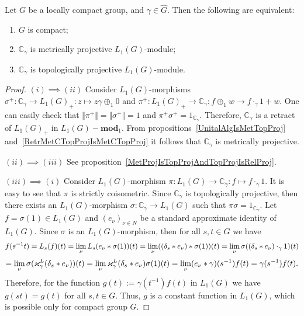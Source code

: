 \begin{proposition}\label{OneDimL1ModMetTopProjCharac} Let $G$ be a locally 
compact group, and $\gamma\in\widehat{G}$. Then the following are equivalent:

\begin{enumerate}[label = (\roman*)]
    \item $G$ is compact;

    \item $\mathbb{C}_\gamma$ is metrically projective $L_1(G)$-module;

    \item $\mathbb{C}_\gamma$ is topologically projective $L_1(G)$-module.
\end{enumerate}
\end{proposition}
\begin{proof} $(i)\implies (ii)$ Consider $L_1(G)$-morphisms 
$\sigma^+:\mathbb{C}_\gamma\to {L_1(G)}_+:z\mapsto z\gamma \oplus_1 0$ 
and $\pi^+:{L_1(G)}_+\to\mathbb{C}_\gamma: f\oplus_1 w\to f\cdot_{\gamma}1+w$. 
One can easily check 
that $\Vert\pi^+\Vert=\Vert\sigma^+\Vert=1$ 
and $\pi^+\sigma^+=1_{\mathbb{C}_\gamma}$. Therefore, $\mathbb{C}_\gamma$ is a 
retract of ${L_1(G)}_+$ in $L_1(G)-\mathbf{mod}_1$. From 
propositions~\ref{UnitalAlgIsMetTopProj} 
and~\ref{RetrMetCTopProjIsMetCTopProj} it follows 
that $\mathbb{C}_\gamma$ is metrically projective.

$(ii)\implies (iii)$ See
proposition~\ref{MetProjIsTopProjAndTopProjIsRelProj}.

$(iii)\implies (i)$ Consider $L_1(G)$-morphism
$\pi:L_1(G)\to\mathbb{C}_\gamma:f\mapsto f\cdot_{\gamma} 1$. It is easy to see
that $\pi$ is strictly coisometric. Since $\mathbb{C}_\gamma$ is topologically
projective, then there exists an $L_1(G)$-morphism $\sigma:\mathbb{C}_\gamma\to
L_1(G)$ such that $\pi\sigma=1_{\mathbb{C}_\gamma}$. Let $f=\sigma(1)\in L_1(G)$
and ${(e_\nu)}_{\nu\in N}$ be a standard approximate identity of $L_1(G)$. Since
$\sigma$ is an $L_1(G)$-morphism, then for all $s,t\in G$ we have 
$$
f(s^{-1}t)
=L_s(f)(t)
=\lim_\nu L_s(e_\nu\ast \sigma(1))(t)
=\lim_\nu((\delta_s\ast e_\nu)\ast \sigma(1))(t)
=\lim_\nu\sigma((\delta_s\ast e_\nu)\cdot_{\gamma} 1)(t)
$$
$$
=\lim_\nu\sigma(\varkappa_\gamma^L(\delta_s\ast e_\nu))(t)
=\lim_\nu\varkappa_\gamma^L(\delta_s\ast e_\nu)\sigma(1)(t)
=\lim_\nu(e_\nu\ast\gamma)(s^{-1})f(t)
=\gamma(s^{-1})f(t).
$$
Therefore, for the function $g(t):=\gamma(t^{-1})f(t)$ in $L_1(G)$ we have
$g(st)=g(t)$ for all $s,t\in G$. Thus, $g$ is a constant function in $L_1(G)$,
which is possible only for compact group $G$.
\end{proof}

